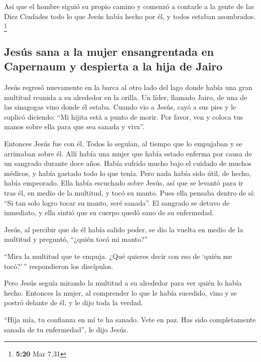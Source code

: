  Así que el hombre siguió su propio camino y comenzó a
contarle a la gente de las Diez Ciudades todo lo que Jesús había hecho
por él, y todos estaban asombrados. \footnote{\textbf{5:20} Mar 7,31}

\hypertarget{jesuxfas-sana-a-la-mujer-ensangrentada-en-capernaum-y-despierta-a-la-hija-de-jairo}{%
\subsection{Jesús sana a la mujer ensangrentada en Capernaum y despierta
a la hija de
Jairo}\label{jesuxfas-sana-a-la-mujer-ensangrentada-en-capernaum-y-despierta-a-la-hija-de-jairo}}

 Jesús regresó nuevamente en la barca al otro lado del
lago donde había una gran multitud reunida a su alrededor en la orilla.
 Un líder, llamado Jairo, de una de las sinagogas vino
donde él estaba. Cuando vio a Jesús, cayó a sus pies  y
le suplicó diciendo: ``Mi hijita está a punto de morir. Por favor, ven y
coloca tus manos sobre ella para que sea sanada y viva''.

 Entonces Jesús fue con él. Todos lo seguían, al tiempo
que lo empujaban y se arrimaban sobre él.  Allí había una
mujer que había estado enferma por causa de un sangrado durante doce
años.  Había sufrido mucho bajo el cuidado de muchos
médicos, y había gastado todo lo que tenía. Pero nada había sido útil,
de hecho, había empeorado.  Ella había escuchado sobre
Jesús, así que se levantó para ir tras él, en medio de la multitud, y
tocó su manto.  Pues ella pensaba dentro de sí: ``Si tan
solo logro tocar su manto, seré sanada''.  El sangrado se
detuvo de inmediato, y ella sintió que su cuerpo quedó sano de su
enfermedad.

 Jesús, al percibir que de él había salido poder, se dio
la vuelta en medio de la multitud y preguntó, ``¿quién tocó mi manto?''

 ``Mira la multitud que te empuja. ¿Qué quieres decir con
eso de `quién me tocó?'\,'' respondieron los discípulos.

 Pero Jesús seguía mirando la multitud a su alrededor
para ver quién lo había hecho.  Entonces la mujer, al
comprender lo que le había sucedido, vino y se postró delante de él, y
le dijo toda la verdad.

 ``Hija mía, tu confianza en mí te ha sanado. Vete en
paz. Has sido completamente sanada de tu enfermedad'', le dijo Jesús.

